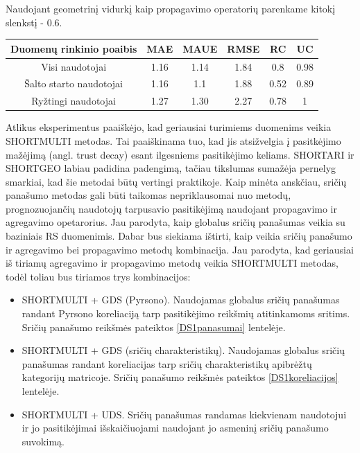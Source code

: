 \documentclass{VUMIFInfMagistrinis}
\begin{document}
Naudojant geometrinį vidurkį kaip propagavimo operatorių parenkame kitokį slenkstį - $0.6$. 
\begin{center}
	\begin{tabular}{||c c c c c c||} 
		Duomenų rinkinio poaibis & MAE & MAUE & RMSE & RC & UC \\
		\hline
		Visi naudotojai & 1.16 & 1.14 & 1.84 & 0.8 & 0.98 \\
		\hline
		Šalto starto naudotojai & 1.16 & 1.1 & 1.88 & 0.52 & 0.89 \\
		\hline
		Ryžtingi naudotojai & 1.27 & 1.30 & 2.27 & 0.78 & 1 \\
	\end{tabular}
\end{center}
\indent
Atlikus eksperimentus paaiškėjo, kad geriausiai turimiems duomenims veikia SHORTMULTI metodas. Tai paaiškinama tuo, kad jis atsižvelgia į pasitkėjimo mažėjimą (angl. trust decay) esant ilgesniems pasitikėjimo keliams. SHORTARI ir SHORTGEO labiau padidina padengimą, tačiau tikslumas sumažėja pernelyg smarkiai, kad šie metodai būtų vertingi praktikoje.
\indent
Kaip minėta anskčiau, sričių panašumo metodas gali būti taikomas nepriklausomai nuo metodų, prognozuojančių naudotojų tarpusavio pasitikėjimą naudojant propagavimo ir agregavimo opetarorius. Jau parodyta, kaip globalus sričių panašumas veikia su baziniais RS duomenimis. Dabar bus siekiama ištirti, kaip veikia sričių panašumo ir agregavimo bei propagavimo metodų kombinacija. Jau parodyta, kad geriausiai iš tiriamų agregavimo ir propagavimo metodų veikia SHORTMULTI metodas, todėl toliau bus tiriamos trys kombinacijos:
\begin{itemize}
	\item  SHORTMULTI + GDS (Pyrsono). Naudojamas globalus sričių panašumas randant Pyrsono koreliaciją tarp pasitikėjimo reikšmių atitinkamoms sritims. Sričių panašumo reikšmės pateiktos \ref{DS1panasumai} lentelėje.
	\item  SHORTMULTI + GDS (sričių charakteristikų). Naudojamas globalus sričių panašumas randant koreliacijas tarp sričių charakteristikų apibrėžtų kategorijų matricoje. Sričių panašumo reikšmės pateiktos \ref{DS1koreliacijos} lentelėje.
	\item  SHORTMULTI + UDS. Sričių panašumas randamas kiekvienam naudotojui ir jo pasitikėjimai išskaičiuojami naudojant jo asmeninį sričių panašumo suvokimą.
\end{itemize}
\end{document}
